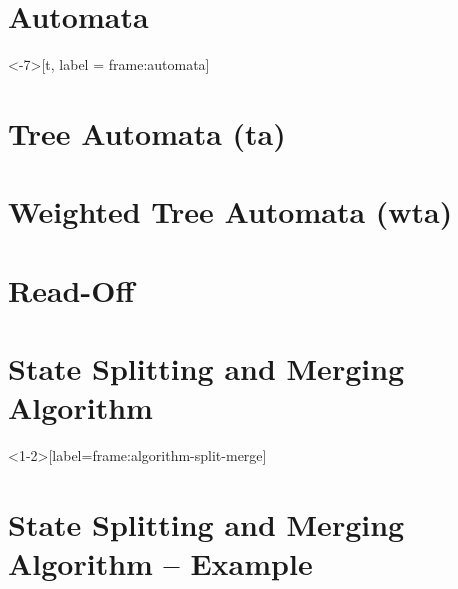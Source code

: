\documentclass{beamer}
\begin{document}
\section{Automata}

\begin{frame}<-7>[t, label = frame:automata]{\secname}
	
\end{frame}


\section{Tree Automata (ta)}



\section{Weighted Tree Automata (wta)}



\section{Read-Off}

\begin{frame}{\secname}
	\centering
	
\end{frame}


\iffalse
\section{Expectation Maximization Algorithm (EM Algorithm)}

\begin{frame}{\secname}
	\centering
	
\end{frame}
\fi




\section{State Splitting and Merging Algorithm}

\begin{frame}<1-2>[label=frame:algorithm-split-merge]{\secname}
	
\end{frame}


\section{State Splitting and Merging Algorithm – Example}
\end{document}
